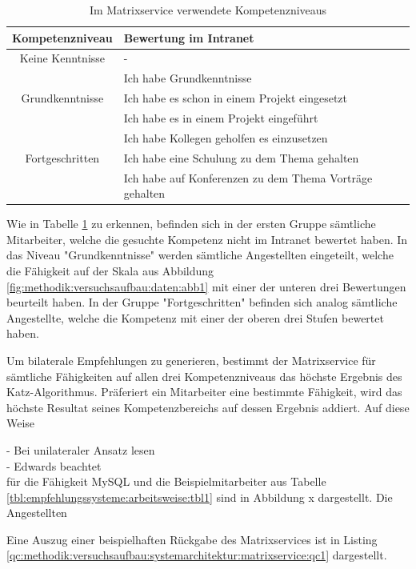 \begin{table}[h]
	\centering
	\begin{tabularx}{\textwidth}{c|X}
		Kompetenzniveau & Bewertung im Intranet\\
		\hline
		Keine Kenntnisse & -\\
		\hline
		& Ich habe Grundkenntnisse\\
		Grundkenntnisse & Ich habe es schon in einem Projekt eingesetzt\\
		& Ich habe es in einem Projekt eingeführt\\
		\hline
		& Ich habe Kollegen geholfen es einzusetzen\\
		Fortgeschritten & Ich habe eine Schulung zu dem Thema gehalten\\
		& Ich habe auf Konferenzen zu dem Thema Vorträge gehalten\\
		\hline
	\end{tabularx}
	\caption{Im Matrixservice verwendete Kompetenzniveaus}
	\label{tbl:methodik:versuchsaufbau:systemarchitektur:matrixservice:tbl1}
\end{table}

Wie in Tabelle \ref{tbl:methodik:versuchsaufbau:systemarchitektur:matrixservice:tbl1} zu erkennen, befinden sich in der ersten Gruppe sämtliche Mitarbeiter, welche die gesuchte Kompetenz nicht im Intranet bewertet haben. In das Niveau "Grundkenntnisse" werden sämtliche Angestellten eingeteilt, welche die Fähigkeit auf der Skala aus Abbildung \ref{fig:methodik:versuchsaufbau:daten:abb1} mit einer der unteren drei Bewertungen beurteilt haben. In der Gruppe "Fortgeschritten" befinden sich analog sämtliche Angestellte, welche die Kompetenz mit einer der oberen drei Stufen bewertet haben.

Um bilaterale Empfehlungen zu generieren, bestimmt der Matrixservice für sämtliche Fähigkeiten auf allen drei Kompetenzniveaus das höchste Ergebnis des Katz-Algorithmus. Präferiert ein Mitarbeiter eine bestimmte Fähigkeit, wird das höchste Resultat seines Kompetenzbereichs auf dessen Ergebnis addiert. Auf diese Weise 

\newpage
- Bei unilateraler Ansatz lesen\\
- Edwards beachtet\\
für die Fähigkeit MySQL und die Beispielmitarbeiter aus Tabelle \ref{tbl:empfehlungssysteme:arbeitsweise:tbl1} sind in Abbildung x dargestellt. Die Angestellten 




Eine Auszug einer beispielhaften Rückgabe des Matrixservices ist in Listing \ref{qc:methodik:versuchsaufbau:systemarchitektur:matrixservice:qc1} dargestellt.

